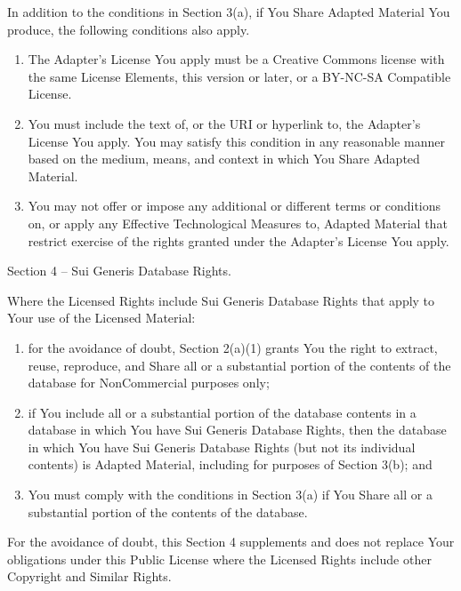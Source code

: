 \documentclass[]{scrbook}
\begin{document}
\begin{enumerate}
  In addition to the conditions in Section 3(a), if You Share Adapted
  Material You produce, the following conditions also apply.

  \begin{enumerate}
  \def\labelenumii{\arabic{enumii}.}
  \item
    The Adapter's License You apply must be a Creative Commons license
    with the same License Elements, this version or later, or a BY-NC-SA
    Compatible License.
  \item
    You must include the text of, or the URI or hyperlink to, the
    Adapter's License You apply. You may satisfy this condition in any
    reasonable manner based on the medium, means, and context in which
    You Share Adapted Material.
  \item
    You may not offer or impose any additional or different terms or
    conditions on, or apply any Effective Technological Measures to,
    Adapted Material that restrict exercise of the rights granted under
    the Adapter's License You apply.
  \end{enumerate}
\end{enumerate}

Section 4 -- Sui Generis Database Rights.

Where the Licensed Rights include Sui Generis Database Rights that apply
to Your use of the Licensed Material:

\begin{enumerate}
\def\labelenumi{\alph{enumi}.}
\item
  for the avoidance of doubt, Section 2(a)(1) grants You the right to
  extract, reuse, reproduce, and Share all or a substantial portion of
  the contents of the database for NonCommercial purposes only;
\item
  if You include all or a substantial portion of the database contents
  in a database in which You have Sui Generis Database Rights, then the
  database in which You have Sui Generis Database Rights (but not its
  individual contents) is Adapted Material, including for purposes of
  Section 3(b); and
\item
  You must comply with the conditions in Section 3(a) if You Share all
  or a substantial portion of the contents of the database.
\end{enumerate}

For the avoidance of doubt, this Section 4 supplements and does not
replace Your obligations under this Public License where the Licensed
Rights include other Copyright and Similar Rights.
\end{document}
